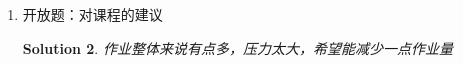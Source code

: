 \documentclass[a4paper,UTF8]{article}
\numberwithin{equation}{section}
\newtheorem*{mySol}{Solution}
\begin{document}
\begin{enumerate}
\begin{mySol}
\begin{enumerate}[1)]
    \item
\end{enumerate}

\end{mySol}




\item 开放题：对课程的建议


\begin{mySol}
	作业整体来说有点多，压力太大，希望能减少一点作业量


\end{mySol}

\end{enumerate}
\end{document}
